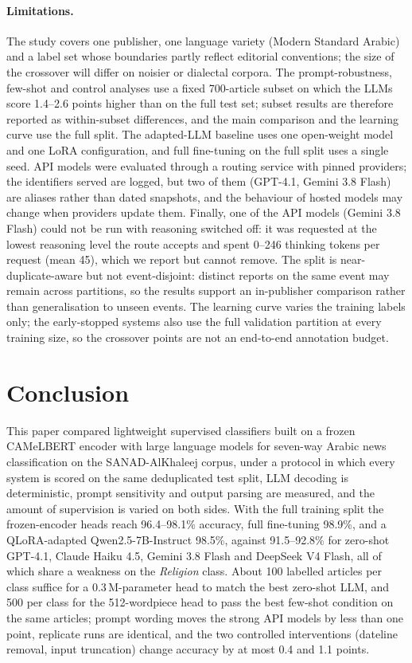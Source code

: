 \documentclass[preprint,12pt,authoryear]{elsarticle}
\newif\ifrevmarkup
\DeclareRobustCommand{\rev}[1]{\ifrevmarkup{\color{blue}#1}\else#1\fi}
\begin{document}
\paragraph{\rev{Limitations.}} \rev{The study covers one publisher, one language variety (Modern Standard Arabic) and a label set whose boundaries partly reflect editorial conventions; the size of the crossover will differ on noisier or dialectal corpora. The prompt-robustness, few-shot and control analyses use a fixed 700-article subset on which the LLMs score 1.4--2.6 points higher than on the full test set; subset results are therefore reported as within-subset differences, and the main comparison and the learning curve use the full split. The adapted-LLM baseline uses one open-weight model and one LoRA configuration, and full fine-tuning on the full split uses a single seed. API models were evaluated through a routing service with pinned providers; the identifiers served are logged, but two of them (GPT-4.1, Gemini 3.8 Flash) are aliases rather than dated snapshots, and the behaviour of hosted models may change when providers update them. Finally, one of the API models (Gemini 3.8 Flash) could not be run with reasoning switched off: it was requested at the lowest reasoning level the route accepts and spent 0--246 thinking tokens per request (mean 45), which we report but cannot remove. The split is near-duplicate-aware but not event-disjoint: distinct reports on the same event may remain across partitions, so the results support an in-publisher comparison rather than generalisation to unseen events. The learning curve varies the training labels only; the early-stopped systems also use the full validation partition at every training size, so the crossover points are not an end-to-end annotation budget.}

\section{Conclusion}
\label{conclusion}

\rev{This paper compared lightweight supervised classifiers built on a frozen CAMeLBERT encoder with large language models for seven-way Arabic news classification on the SANAD-AlKhaleej corpus, under a protocol in which every system is scored on the same deduplicated test split, LLM decoding is deterministic, prompt sensitivity and output parsing are measured, and the amount of supervision is varied on both sides.} With the full training split the frozen-encoder heads reach 96.4--98.1\% accuracy, full fine-tuning 98.9\%, and a QLoRA-adapted Qwen2.5-7B-Instruct 98.5\%, against 91.5--92.8\% for zero-shot GPT-4.1, Claude Haiku 4.5, Gemini 3.8 Flash and DeepSeek V4 Flash, all of which share a weakness on the \textit{Religion} class. \rev{About 100 labelled articles per class suffice for a 0.3\,M-parameter head to match the best zero-shot LLM, and 500 per class for the 512-wordpiece head to pass the best few-shot condition on the same articles; prompt wording moves the strong API models by less than one point, replicate runs are identical, and the two controlled interventions (dateline removal, input truncation) change accuracy by at most 0.4 and 1.1 points.}
\end{document}
